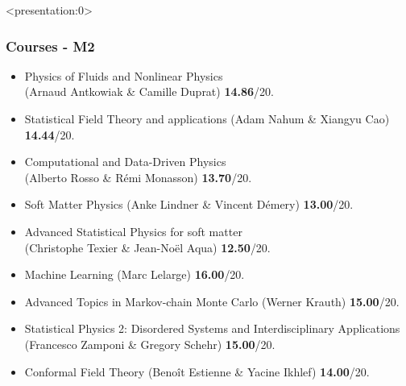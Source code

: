 \begin{frame}<presentation:0>
	\frametitle{Courses - M2}
	\begin{itemize}
	\setlength{\itemsep}{4pt}
    \setlength{\parsep}{0pt}
    \setlength{\parskip}{0pt}
		\item Physics of Fluids and Nonlinear Physics \\ (Arnaud Antkowiak \& Camille Duprat) \hfill \textbf{14.86}/20.
		\item Statistical Field Theory and applications  (Adam Nahum \& Xiangyu Cao) \hfill \textbf{14.44}/20.
		\item Computational and Data-Driven Physics \\ (Alberto Rosso \& Rémi Monasson) \hfill \textbf{13.70}/20.
		\item Soft Matter Physics  (Anke Lindner \& Vincent Démery)  \hfill \textbf{13.00}/20.
		\item Advanced Statistical Physics for soft matter \\ (Christophe Texier \& Jean-Noël Aqua) \hfill \textbf{12.50}/20.
		
		\bigskip \hline
		
		\item Machine Learning (Marc Lelarge) \hfill \textbf{16.00}/20.
		\item Advanced Topics in Markov-chain Monte Carlo (Werner Krauth) \hfill \textbf{15.00}/20.
		\item Statistical Physics 2: Disordered Systems and Interdisciplinary Applications (Francesco Zamponi \& Gregory Schehr)  \hfill \textbf{15.00}/20.
		\item Conformal Field Theory (Benoît Estienne \& Yacine Ikhlef) \hfill \textbf{14.00}/20.
		
		

		
    \end{itemize}
\end{frame}





